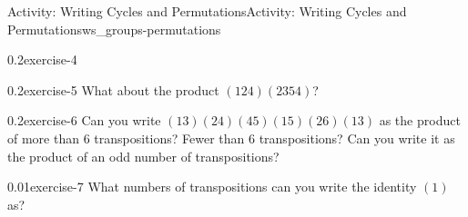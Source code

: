 \documentclass[oneside,11pt,]{article}
\begin{document}
\begin{worksheet-section-numberless}{Activity: Writing Cycles and Permutations}{}{Activity: Writing Cycles and Permutations}{}{}{ws_groups-permutations}
\begin{divisionexercise}{4}{}{0.2}{exercise-4}
\end{divisionexercise}%
\begin{divisionexercise}{5}{}{0.2}{exercise-5}%
\hypertarget{p-11}{}%
What about the product \((124)(2354)\)?%
\end{divisionexercise}%
\begin{divisionexercise}{6}{}{0.2}{exercise-6}%
\hypertarget{p-13}{}%
Can you write \((13)(24)(45)(15)(26)(13)\) as the product of more than 6 transpositions?  Fewer than 6 transpositions?  Can you write it as the product of an odd number of transpositions?%
\end{divisionexercise}%
\begin{divisionexercise}{7}{}{0.01}{exercise-7}%
\hypertarget{p-15}{}%
What numbers of transpositions can you write the identity \((1)\) as?%
\end{divisionexercise}%
\end{worksheet-section-numberless}
\restoregeometry
\end{document}
